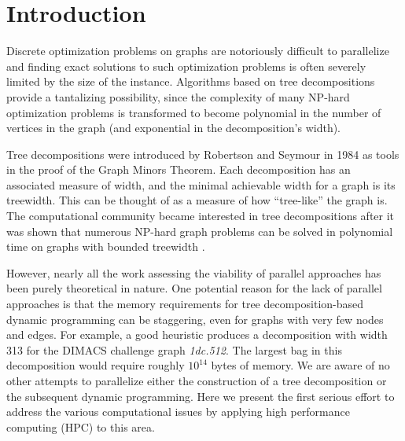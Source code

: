\documentclass[conference]{IEEEtran}
\begin{document}
\section{Introduction}

Discrete optimization problems on graphs are
notoriously difficult to parallelize and finding exact solutions to
such optimization problems is often severely limited by the size of the instance.  Algorithms
based on tree decompositions provide a tantalizing possibility, since
the complexity of many NP-hard optimization problems
is transformed to become polynomial in the number of vertices in the
graph (and exponential in the decomposition's width). 

Tree decompositions were introduced by Robertson and Seymour in 1984
\cite{RobertsonSeymour1984} as tools in the proof of the Graph Minors Theorem.
Each decomposition has an associated measure of width, and the minimal achievable width
for a graph is its treewidth. This can be thought of as a measure of how ``tree-like'' the graph is.
The computational community became interested in tree decompositions after it was
shown that numerous NP-hard graph problems can be solved in polynomial time
on graphs with bounded treewidth \cite{Courcelle1990Rewriting}.

However, nearly all the work assessing the viability of parallel approaches has been
purely theoretical in nature.
One potential reason for the lack of parallel approaches is that
the memory requirements for tree decomposition-based
dynamic programming can be staggering, even for graphs with very few nodes and edges.
For example, a good heuristic produces a decomposition with width 313 for the
DIMACS challenge graph \emph{1dc.512}. \cite{DIMACS}  The largest bag in this decomposition would
require roughly $10^{14}$ bytes of memory.
We are aware of no other attempts to
parallelize either the construction of a tree decomposition or the
subsequent dynamic programming.  Here we present the first
serious effort to address the various computational issues by
applying high performance computing (HPC) to this area.
\end{document}
